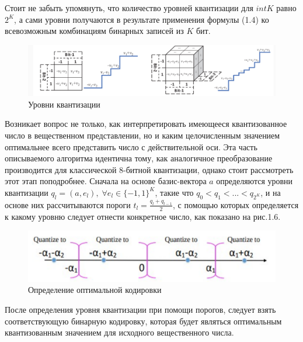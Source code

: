 Стоит не забыть упомянуть, что количество уровней квантизации для $intK$ равно $2^K$, а сами уровни получаются в результате применения формулы (1.4) ко всевозможным комбинациям бинарных записей из $K$ бит.

\begin{figure}[H]
    \begin{center}
        \includegraphics[scale=0.35]{tex/inc/img/lvls2.jpg}
        \caption{Уровни квантизации}
    \end{center}
\end{figure}

Возникает вопрос не только, как интерпретировать имеющееся квантизованное число в вещественном представлении, но и каким целочисленным значением оптимальнее всего представить число с действительной оси. Эта часть описываемого алгоритма идентична тому, как аналогичное преобразование производится для классической $8$-битной квантизации, однако стоит рассмотреть этот этап поподробнее. Сначала на основе базис-вектора $a$ определяются уровни квантизации $q_l = (a, e_l), \; \forall e_l \in \{ -1, 1 \}^K$, такие что $q_0 < q_1 < ... < q_{2^K}$, и на основе них рассчитываются пороги  $t_l = \displaystyle\frac{q_l + q_{l-1}}{2}$, с помощью которых определяется к какому уровню следует отнести конкретное число, как показано на рис.1.6. 

\begin{figure}[H]
    \begin{center}
        \includegraphics[scale=0.3]{tex/inc/img/define.jpg}
        \caption{Определение оптимальной кодировки}
    \end{center}
\end{figure}

После определения уровня квантизации  при помощи порогов, следует взять соответствующую бинарную кодировку, которая будет являться оптимальным квантизованным значением для исходного вещественного числа.

